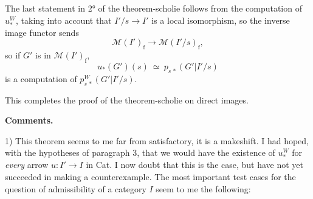 \documentclass[11pt]{article}
\newcommand{\printedpage}[1]{\marginpar{\footnotesize p.~#1}}
\newcommand{\msp}[1]{\marginpar{\footnotesize [#1]}}
\newcommand{\M}{\mathcal{M}}
\newcommand{\rf}{\mathrm{f}}
\begin{document}
\printedpage{40}

\msp{page 72}

The last statement in 2° of the theorem-scholie follows from the computation of $u_*^W$, taking into account that $I'/s \longrightarrow I'$ is a local isomorphism, so the inverse image functor sends
\[
\M(I')_{\rf} \longrightarrow \M(I'/s)_{\rf},
\]
so if $G'$ is in $\M(I')_{\rf}$,
\[
u_*(G')(s) \ \simeq\ p_{s\,*}(G'|I'/s)
\]
is a computation of $p^W_{s\,*}(G'|I'/s)$.

This completes the proof of the theorem-scholie on direct images.

\textbf{Comments.}

1) This theorem seems to me far from satisfactory, it is a makeshift. I had hoped, with the hypotheses of paragraph 3, that we would have the existence of $u_*^W$ for \textit{every} arrow $u : I' \longrightarrow I$ in Cat. I now doubt that this is the case, but have not yet succeeded in making a counterexample. The most important test cases for the question of admissibility of a category $I$ seem to me the following:
\end{document}
